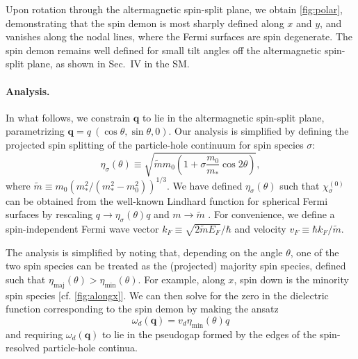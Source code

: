 \documentclass[aps,prl,reprint,twocolumns,superscriptaddress]{revtex4-2}
\newcommand{\mdos}{\tilde{m}}
\newcommand{\kF}{k_{F}}
\newcommand{\vs}{v_d}
\newcommand{\subfigref}[2]{Fig.~\hyperref[#1]{\ref*{#1}#2}}
\begin{document}
	
	Upon rotation through the altermagnetic spin-split plane, we obtain \cref{fig:polar}, demonstrating that the spin demon is most sharply defined along $x$ and $y$, and vanishes along the nodal lines, where the Fermi surfaces are spin degenerate. 
	The spin demon remains well defined for small tilt angles off the altermagnetic spin-split plane, as shown in Sec.~IV in the SM.
	
	
	
	
	\paragraph{Analysis. }
	In what follows, we constrain $\bm q$ to lie in the altermagnetic spin-split plane, parametrizing $\bm q = q\  (\cos\theta,\sin\theta,0)$. Our analysis is simplified by defining the projected spin splitting of the particle-hole continuum for spin species $\sigma$:
	\begin{equation}
		\eta_{\sigma}(\theta) \equiv \sqrt{\mdos m_0\left( 1+\sigma \frac{m_0}{m_*}\cos2\theta\right)} \label{eq:sigma},
	\end{equation}
	where $\mdos\equiv m_0({m_*^2}/({m_*^2-m_0^2}))^{1/3}$.
	We have defined $\eta_{\sigma}(\theta)$ such that $\chi^{(0)}_\sigma$ can be obtained from the well-known Lindhard function for spherical Fermi surfaces \cite{lindhardPropertiesGasCharged1954,giulianiQuantumTheoryElectron2005} by rescaling $q\rightarrow\eta_\sigma(\theta) q$ and $m\rightarrow \mdos$ \cite{ahnAnisotropicFermionicQuasiparticles2021}. For convenience, we define a spin-independent Fermi wave vector $\kF\equiv\sqrt{2\mdos E_F}/\hbar$ and velocity $v_F\equiv \hbar k_F/\mdos$.
	
	The analysis is simplified by noting that, depending on the angle $\theta$, one of the two spin species can be treated as the (projected) majority spin species, defined such that $\eta_{{\mathrm{maj}}}(\theta)>\eta_{{\mathrm{min}}}(\theta)$. For example, along $x$, spin down is the minority spin species [cf. \cref{fig:alongx}].
	We can then solve for the zero in the dielectric function corresponding to the spin demon by making the ansatz \cite{santoroAcousticPlasmonsConducting1988}
	\begin{equation}
		\omega_{d}(\bm q)=\vs \eta_{{\mathrm{min}}}(\theta)q
	\end{equation}
	and requiring $\omega_{d}(\bm q)$ to lie in the pseudogap formed by the edges of the spin-resolved particle-hole continua.
	
\end{document}
